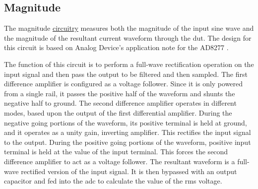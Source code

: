 \subsection{Magnitude}
\label{sec:mag}

The magnitude \hyperlink{sch:imph}{circuitry} measures both the magnitude of the input sine wave and the magnitude of the resultant current waveform through the \gls{dut}. The design for this circuit is based on Analog Device's application note for the AD8277 \cite{absCircuit}.

The function of this circuit is to perform a full-wave rectification operation on the input signal and then pass the output to be filtered and then sampled. The first difference amplifier is configured as a voltage follower. Since it is only powered from a single rail, it passes the positive half of the waveform and shunts the negative half to ground. The second difference amplifier operates in different modes, based upon the output of the first differential amplifier. During the negative going portions of the waveform, its positive terminal is held at ground, and it operates as a unity gain, inverting amplifier. This rectifies the input signal to the output. During the positive going portions of the waveform, positive input terminal is held at the value of the input terminal. This forces the second difference amplifier to act as a voltage follower. The resultant waveform is a full-wave rectified version of the input signal. It is then bypassed with an output capacitor and fed into the \gls{adc} to calculate the value of the rms voltage.

